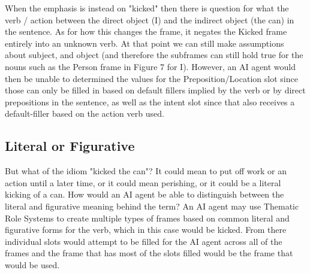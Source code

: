 \documentclass[
	letterpaper, %
]{jdf}
\begin{document}
When the emphasis is instead on "kicked" then there is question for what the verb / action between the direct object (I) and the indirect object (the can) in the sentence. As for how this changes the frame, it negates the Kicked frame entirely into an unknown verb. At that point we can still make assumptions about subject, and object (and therefore the subframes can still hold true for the nouns such as the Person frame in Figure 7 for I). However, an AI agent would then be unable to determined the values for the Preposition/Location slot since those can only be filled in based on default fillers implied by the verb or by direct prepositions in the sentence, as well as the intent slot since that also receives a default-filler based on the action verb used.

\subsection{Literal or Figurative}
But what of the idiom "kicked the can"? It could mean to put off work or an action until a later time, or it could mean perishing, or it could be a literal kicking of a can. How would an AI agent be able to distinguish between the literal and figurative meaning behind the term? An AI agent may use Thematic Role Systems to create multiple types of frames based on common literal and figurative forms for the verb, which in this case would be kicked. From there individual slots would attempt to be filled for the AI agent across all of the frames and the frame that has most of the slots filled would be the frame that would be used.
\end{document}
